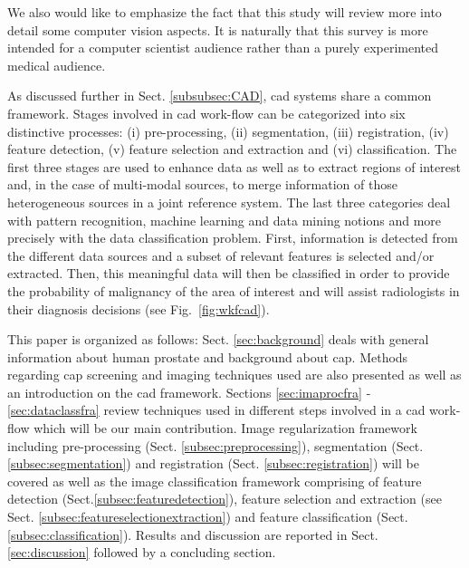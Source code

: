 {\color{red}We also would like to emphasize the fact that this study will review more into detail some computer vision aspects. It is naturally that this survey is more intended for a computer scientist audience rather than a purely experimented medical audience.}

As discussed further in Sect. \ref{subsubsec:CAD}, \acs{cad} systems share a common framework. Stages involved in \acs{cad} work-flow can be categorized into six distinctive processes: (i) pre-processing, (ii) segmentation, (iii) registration, (iv) feature detection, (v) feature selection and extraction and (vi) classification. The first three stages are used to enhance data as well as to extract regions of interest and, in the case of multi-modal sources, to merge information of those heterogeneous sources in a joint reference system. The last three categories deal with pattern recognition, machine learning and data mining notions and more precisely with the data classification problem. First, information is detected from the different data sources and a subset of relevant features is selected and/or extracted. Then, this meaningful data will then be classified in order to provide the probability of malignancy of the area of interest and will assist radiologists in their diagnosis decisions (see Fig.~\ref{fig:wkfcad}).

This paper is organized as follows: Sect. \ref{sec:background} deals with general information about human prostate and background about \ac{cap}. Methods regarding \ac{cap} screening and imaging techniques used are also presented as well as an introduction on the \acs{cad} framework. Sections \ref{sec:imaprocfra} - \ref{sec:dataclassfra} review techniques used in different steps involved in a \acs{cad} work-flow which will be our main contribution. Image regularization framework including pre-processing (Sect. \ref{subsec:preprocessing}), segmentation (Sect. \ref{subsec:segmentation}) and registration (Sect. \ref{subsec:registration}) will be covered as well as the image classification framework comprising of feature detection (Sect.\ref{subsec:featuredetection}), feature selection and extraction (see Sect. \ref{subsec:featureselectionextraction}) and feature classification (Sect. \ref{subsec:classification}). Results and discussion are reported in Sect. \ref{sec:discussion} followed by a concluding section.